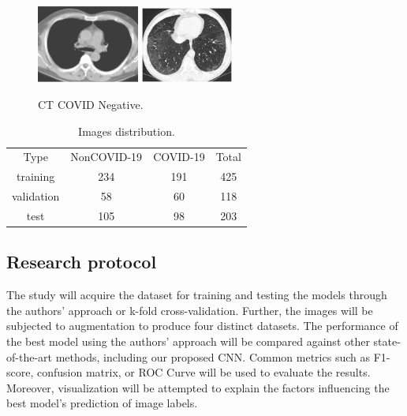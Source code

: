 \documentclass[runningheads]{llncs}
\begin{document}
\begin{figure}[h]
\centering
{
\includegraphics[width=0.30\textwidth]{imagesDatasetSection/noncovid1.jpg}
}
\quad
{
\includegraphics[width=0.27\textwidth]{imagesDatasetSection/noncovid2.jpg}
}
\label{covidNegative}
\caption{CT COVID Negative.}
\end{figure}

\begin{table}[h]
\label{imageDistributionAuthors}
\centering
\caption{Images distribution.}
\begin{tabular}{c|c|c|c}
\cline{1-4}
Type & NonCOVID-19 & COVID-19 & Total \\ \cline{1-4}
training & 234 & 191 & 425\\ \cline{1-4}
validation & 58 & 60 & 118\\ \cline{1-4}
test & 105  & 98 & 203\\ \cline{1-4}
\end{tabular}
\end{table} 


\subsection{Research protocol}

The study will acquire the dataset for training and testing the models through the authors' approach or k-fold cross-validation. Further, the images will be subjected to augmentation to produce four distinct datasets. The performance of the best model using the authors' approach will be compared against other state-of-the-art methods, including our proposed CNN. Common metrics such as F1-score, confusion matrix, or ROC Curve will be used to evaluate the results. Moreover, visualization will be attempted to explain the factors influencing the best model's prediction of image labels.
\end{document}
